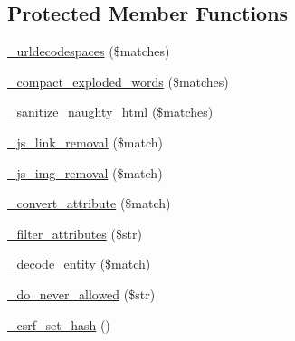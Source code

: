 \subsection*{Protected Member Functions}
\begin{DoxyCompactItemize}
\item 
\mbox{\hyperlink{class_c_i___security_aed66bb1c40ccc25c96326da7c0e2088a}{\+\_\+urldecodespaces}} (\$matches)
\item 
\mbox{\hyperlink{class_c_i___security_adfb0e251ae35ae40303a302d253c3ab2}{\+\_\+compact\+\_\+exploded\+\_\+words}} (\$matches)
\item 
\mbox{\hyperlink{class_c_i___security_af67689597607833df370031fb799c92b}{\+\_\+sanitize\+\_\+naughty\+\_\+html}} (\$matches)
\item 
\mbox{\hyperlink{class_c_i___security_a6b1744acaf85e05c65ab17242dea4f06}{\+\_\+js\+\_\+link\+\_\+removal}} (\$match)
\item 
\mbox{\hyperlink{class_c_i___security_a5c5e91dc8e3df0174e4e074dd375a8db}{\+\_\+js\+\_\+img\+\_\+removal}} (\$match)
\item 
\mbox{\hyperlink{class_c_i___security_ae16451bcdc769285c499cbf8068b3523}{\+\_\+convert\+\_\+attribute}} (\$match)
\item 
\mbox{\hyperlink{class_c_i___security_aa385a9c7527f5eece656b9cac73979d3}{\+\_\+filter\+\_\+attributes}} (\$str)
\item 
\mbox{\hyperlink{class_c_i___security_a5289832cb3ae9cee3c12e82ede958874}{\+\_\+decode\+\_\+entity}} (\$match)
\item 
\mbox{\hyperlink{class_c_i___security_a61217e43f888cdf8afb1fba16b5cd9f6}{\+\_\+do\+\_\+never\+\_\+allowed}} (\$str)
\item 
\mbox{\hyperlink{class_c_i___security_a7064dd5501c1dfab05ba6ac8838beb01}{\+\_\+csrf\+\_\+set\+\_\+hash}} ()
\end{DoxyCompactItemize}
